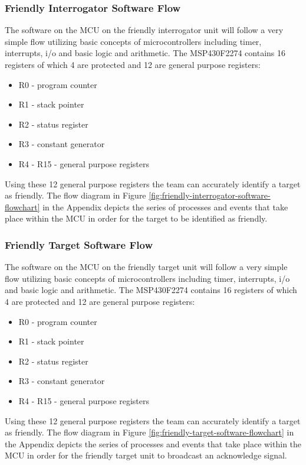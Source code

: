 \documentclass[letterpaper,10pt]{article}
\begin{document}
\begin{spacing}{1.15}
\subsubsection{Friendly Interrogator Software Flow}
The software on the MCU on the friendly interrogator unit will follow a very simple flow utilizing basic concepts of microcontrollers including timer, interrupts, i/o and basic logic and arithmetic. The MSP430F2274 contains 16 registers of which 4 are protected and 12 are general purpose registers:
\begin{itemize}
	\item R0 - program counter
	\item R1 - stack pointer 
	\item R2 - status register
	\item R3 - constant generator
	\item R4 - R15 - general purpose registers
\end{itemize}
Using these 12 general purpose registers the team can accurately identify a target as friendly. The flow diagram in Figure \ref*{fig:friendly-interrogator-software-flowchart} in the Appendix depicts the series of processes and events that take place within the MCU in order for the target to be identified as friendly. 

\subsubsection{Friendly Target Software Flow}
The software on the MCU on the friendly target unit will follow a very simple flow utilizing basic concepts of microcontrollers including timer, interrupts, i/o and basic logic and arithmetic. The MSP430F2274 contains 16 registers of which 4 are protected and 12 are general purpose registers:
\begin{itemize}
	\item R0 - program counter
	\item R1 - stack pointer 
	\item R2 - status register
	\item R3 - constant generator
	\item R4 - R15 - general purpose registers
\end{itemize}
Using these 12 general purpose registers the team can accurately identify a target as friendly. The flow diagram in Figure \ref*{fig:friendly-target-software-flowchart} in the Appendix depicts the series of processes and events that take place within the MCU in order for the friendly target unit to broadcast an acknowledge signal. 


\end{spacing}
\end{document}

